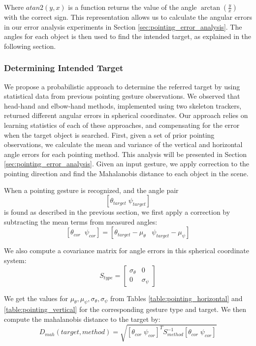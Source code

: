 Where $atan2(y,x)$ is a function returns the value of the angle $\arctan(\frac{y}{x})$ with the correct sign. This representation allows us to calculate the angular errors in our error analysis experiments in Section \ref{sec:pointing_error_analysis}. The angles for each object is then used to find the intended target, as explained in the following section.


\subsubsection{Determining Intended Target}
\label{sec:pointing_determining_intended_target}

We propose a probabilistic approach to determine the referred target by using statistical data from previous pointing gesture observations. We observed that head-hand and elbow-hand methods, implemented using two skeleton trackers, returned different angular errors in spherical coordinates. Our approach relies on learning statistics of each of these approaches, and compensating for the error when the target object is searched. First, given a set of prior pointing observations, we calculate the mean and variance of the vertical and horizontal angle errors for each pointing method. This analysis will be presented in Section \ref{sec:pointing_error_analysis}. Given an input gesture, we apply correction to the pointing direction and find the Mahalanobis distance to each object in the scene.

When a pointing gesture is recognized, and the angle pair $$[\theta_{target}\;\psi_{target}]$$ is found as described in the previous section, we first apply a correction by subtracting the mean terms from measured angles:
$$[\theta_{cor}\;\;\psi_{cor}]=[\theta_{target}-\mu_{\theta}\;\;\;\psi_{target}-\mu_{\psi}]$$
 
We also compute a covariance matrix for angle errors in this spherical coordinate system: 
$$S_{type} = \begin{bmatrix}
\sigma_{\theta}&0\\ 0&\sigma_{\psi}
\end{bmatrix} $$

We get the values for $\mu_{\theta}, \mu_{\psi}, \sigma_{\theta} ,\sigma_{\psi}$ from Tables \ref{table:pointing_horizontal} and \ref{table:pointing_vertical} for the corresponding gesture type and target. We then compute the mahalanobis distance to the target by:
$$D_{mah}(target,method)=\sqrt{ [\theta_{cor}\;\psi_{cor}]^T S_{method}^{-1} [\theta_{cor}\;\psi_{cor}]}$$
 
